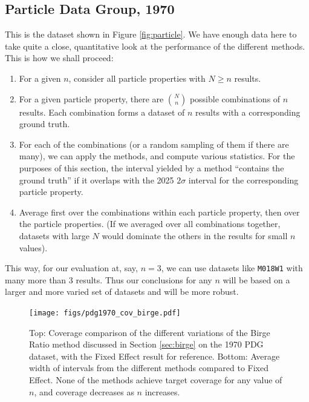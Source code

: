 \documentclass[letterpaper,12pt]{article}
\begin{document}
\subsection{Particle Data Group, 1970}

This is the dataset shown in Figure \ref{fig:particle}. We have enough data here to take quite a close, quantitative look at the performance of the different methods. This is how we shall proceed:
\begin{enumerate}
  \item For a given $n$, consider all particle properties with $N\geq n$ results.
  \item For a given particle property, there are $\binom{N}{n}$ possible combinations of $n$ results. Each combination forms a dataset of $n$ results with a corresponding ground truth.
  \item For each of the combinations (or a random sampling of them if there are many), we can apply the methods, and compute various statistics. For the purposes of this section, the interval yielded by a method ``contains the ground truth'' if it overlaps with the 2025 $2\sigma$ interval for the corresponding particle property.
  \item Average first over the combinations within each particle property, then over the particle properties. (If we averaged over all combinations together, datasets with large $N$ would dominate the others in the results for small $n$ values).
\end{enumerate}
This way, for our evaluation at, say, $n=3$, we can use datasets like \texttt{M018W1} with many more than 3 results. Thus our conclusions for any $n$ will be based on a larger and more varied set of datasets and will be more robust.

\begin{figure}[htbp]
  \texttt{[image: figs/pdg1970\_cov\_birge.pdf]}
\caption{
Top: Coverage comparison of the different variations of the Birge Ratio method discussed in Section \ref{sec:birge} on the 1970 PDG dataset, with the Fixed Effect result for reference. Bottom: Average width of intervals from the different methods compared to Fixed Effect. None of the methods achieve target coverage for any value of $n$, and coverage decreases as $n$ increases.
}\label{fig:pdg1970-cov-birge}
\end{figure}
\end{document}
